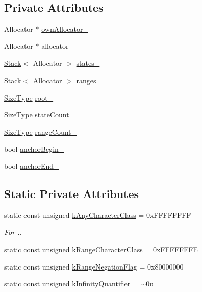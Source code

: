\subsection*{Private Attributes}
\begin{DoxyCompactItemize}
\item 
Allocator $\ast$ \hyperlink{classinternal_1_1GenericRegex_a63f4d8c4e3d61fcd9f1489347708ded8}{own\+Allocator\+\_\+}
\item 
Allocator $\ast$ \hyperlink{classinternal_1_1GenericRegex_a2fb2543ae1c5ec68f891745fa69af0e3}{allocator\+\_\+}
\item 
\hyperlink{classinternal_1_1Stack}{Stack}$<$ Allocator $>$ \hyperlink{classinternal_1_1GenericRegex_a5391b182b60bb8967dd0a6d99db9c9f0}{states\+\_\+}
\item 
\hyperlink{classinternal_1_1Stack}{Stack}$<$ Allocator $>$ \hyperlink{classinternal_1_1GenericRegex_af94c64023502147345303d70ff594140}{ranges\+\_\+}
\item 
\hyperlink{rapidjson_8h_a5ed6e6e67250fadbd041127e6386dcb5}{Size\+Type} \hyperlink{classinternal_1_1GenericRegex_a2af8c29234a2229b509fdf60cf265201}{root\+\_\+}
\item 
\hyperlink{rapidjson_8h_a5ed6e6e67250fadbd041127e6386dcb5}{Size\+Type} \hyperlink{classinternal_1_1GenericRegex_af47146f067e491bb9cb23b13a88a26db}{state\+Count\+\_\+}
\item 
\hyperlink{rapidjson_8h_a5ed6e6e67250fadbd041127e6386dcb5}{Size\+Type} \hyperlink{classinternal_1_1GenericRegex_ad65c6144b7dc5b0441ef20dc4ef81619}{range\+Count\+\_\+}
\item 
bool \hyperlink{classinternal_1_1GenericRegex_ac99b045cc5250649ea3708bee95a56e8}{anchor\+Begin\+\_\+}
\item 
bool \hyperlink{classinternal_1_1GenericRegex_adbd19f8921ece1563d02e74f479d2e13}{anchor\+End\+\_\+}
\end{DoxyCompactItemize}
\subsection*{Static Private Attributes}
\begin{DoxyCompactItemize}
\item 
static const unsigned \hyperlink{classinternal_1_1GenericRegex_a1f3b72c56d5eab221ba46a473ff611dd}{k\+Any\+Character\+Class} = 0x\+F\+F\+F\+F\+F\+F\+FF
\begin{DoxyCompactList}\small\item\em For \textquotesingle{}.\textquotesingle{}. \end{DoxyCompactList}\item 
static const unsigned \hyperlink{classinternal_1_1GenericRegex_aec665a90fdb2372dbc18a6ca0971e886}{k\+Range\+Character\+Class} = 0x\+F\+F\+F\+F\+F\+F\+FE
\item 
static const unsigned \hyperlink{classinternal_1_1GenericRegex_ae435570506343e24811e588614f6842b}{k\+Range\+Negation\+Flag} = 0x80000000
\item 
static const unsigned \hyperlink{classinternal_1_1GenericRegex_a12955d17d702f2fa9cf39421666c3ff3}{k\+Infinity\+Quantifier} = $\sim$0u
\end{DoxyCompactItemize}
